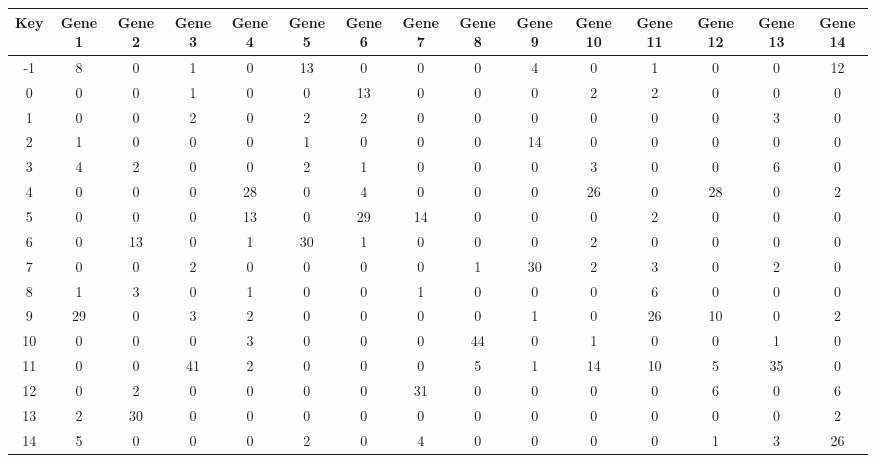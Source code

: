 \begin{tabular}{|c|c|c|c|c|c|c|c|c|c|c|c|c|c|c|}
\hline
Key & Gene 1 & Gene 2 & Gene 3 & Gene 4 & Gene 5 & Gene 6 & Gene 7 & Gene 8 & Gene 9 & Gene 10 & Gene 11 & Gene 12 & Gene 13 & Gene 14 \\
\hline
-1 & 8 & 0 & 1 & 0 & 13 & 0 & 0 & 0 & 4 & 0 & 1 & 0 & 0 & 12 \\
0 & 0 & 0 & 1 & 0 & 0 & 13 & 0 & 0 & 0 & 2 & 2 & 0 & 0 & 0 \\
1 & 0 & 0 & 2 & 0 & 2 & 2 & 0 & 0 & 0 & 0 & 0 & 0 & 3 & 0 \\
2 & 1 & 0 & 0 & 0 & 1 & 0 & 0 & 0 & 14 & 0 & 0 & 0 & 0 & 0 \\
3 & 4 & 2 & 0 & 0 & 2 & 1 & 0 & 0 & 0 & 3 & 0 & 0 & 6 & 0 \\
4 & 0 & 0 & 0 & 28 & 0 & 4 & 0 & 0 & 0 & 26 & 0 & 28 & 0 & 2 \\
5 & 0 & 0 & 0 & 13 & 0 & 29 & 14 & 0 & 0 & 0 & 2 & 0 & 0 & 0 \\
6 & 0 & 13 & 0 & 1 & 30 & 1 & 0 & 0 & 0 & 2 & 0 & 0 & 0 & 0 \\
7 & 0 & 0 & 2 & 0 & 0 & 0 & 0 & 1 & 30 & 2 & 3 & 0 & 2 & 0 \\
8 & 1 & 3 & 0 & 1 & 0 & 0 & 1 & 0 & 0 & 0 & 6 & 0 & 0 & 0 \\
9 & 29 & 0 & 3 & 2 & 0 & 0 & 0 & 0 & 1 & 0 & 26 & 10 & 0 & 2 \\
10 & 0 & 0 & 0 & 3 & 0 & 0 & 0 & 44 & 0 & 1 & 0 & 0 & 1 & 0 \\
11 & 0 & 0 & 41 & 2 & 0 & 0 & 0 & 5 & 1 & 14 & 10 & 5 & 35 & 0 \\
12 & 0 & 2 & 0 & 0 & 0 & 0 & 31 & 0 & 0 & 0 & 0 & 6 & 0 & 6 \\
13 & 2 & 30 & 0 & 0 & 0 & 0 & 0 & 0 & 0 & 0 & 0 & 0 & 0 & 2 \\
14 & 5 & 0 & 0 & 0 & 2 & 0 & 4 & 0 & 0 & 0 & 0 & 1 & 3 & 26 \\
\hline
\end{tabular}